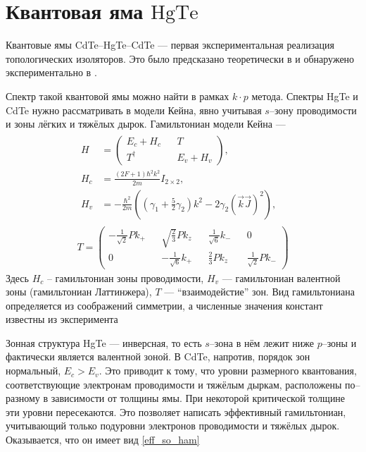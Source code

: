 \section{Квантовая яма $\mathrm{HgTe}$}
Квантовые ямы CdTe--HgTe--CdTe --- первая экспериментальная реализация
топологических изоляторов. Это было предсказано теоретически в \cite{Bernevig2006} и
обнаружено экспериментально в \cite{Konig2007}. 
%

Спектр такой квантовой ямы можно найти в рамках $k\cdot p$ метода. Спектры HgTe и CdTe 
нужно рассматривать в модели Кейна, явно учитывая $s$--зону проводимости и зоны 
лёгких и тяжёлых дырок. Гамильтониан модели Кейна --- 
\begin{equation}
    \begin{gathered}
        \begin{split}
            H &= \begin{pmatrix}
                    E_c + H_c &&  T \\
                    T^\dagger && E_v + H_v
                \end{pmatrix},\\
            H_c& = \frac{(2F+1)\hbar^2k^2}{2m}I_{2\times2},\\
            H_v& = -\frac{\hbar^2}{2m}((\gamma_1 + \frac52\gamma_2)k^2 - 
                2\gamma_2(\vec{k}\vec{J})^2), 
        \end{split}\\
        T = \begin{pmatrix}
                 -\frac{1}{\sqrt{2}}Pk_{+} && \sqrt{\frac23}Pk_z && 
                                        \frac{1}{\sqrt{6}}k_{-} && 0  \\
                  0 && -\frac{1}{\sqrt{6}}k_{+} && \frac{2}{3}P k_z 
                                        && \frac{1}{\sqrt{2}}P k_{-}
            \end{pmatrix}
    \end{gathered}
\end{equation}
Здесь $H_c$ -- гамильтониан зоны проводимости, $H_v$ --- гамильтониан валентной зоны
(гамильтониан Латтинжера), $T$ --- ``взаимодейстие'' зон. Вид гамильтониана определяется
из соображений симметрии, а численные значения констант известны из эксперимента 

Зонная структура HgTe --- инверсная, то есть $s$--зона в нём лежит ниже $p$--зоны и
фактически является валентной зоной.
В CdTe, напротив, порядок зон нормальный, $E_c > E_v$. Это приводит к тому, что
уровни размерного квантования, соответствующие электронам проводимости и тяжёлым 
дыркам, расположены по--разному в зависимости от толщины ямы. При некоторой критической
толщине эти уровни пересекаются. Это позволяет написать эффективный гамильтониан, учитывающий
только подуровни электронов проводимости и тяжёлых дырок. Оказывается, что он имеет вид
\eqref{eff_so_ham}
